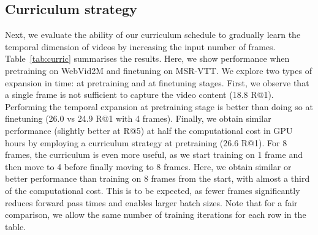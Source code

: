 \documentclass[10pt,twocolumn,letterpaper]{article}
\begin{document}
\subsection{Curriculum strategy}
\label{subsec:curriculumexp}
Next, we evaluate the ability of our curriculum schedule
to gradually learn the temporal dimension of videos
by increasing the input number of frames.
Table~\ref{tab:curric} summarises the results.
Here, we show performance when pretraining on WebVid2M and
finetuning on MSR-VTT.
We explore two types of expansion in time:
at pretraining and at finetuning stages.
First, we observe that a single frame is not sufficient
to capture the video content (18.8 R@1).
Performing the temporal expansion at pretraining stage
is better than doing so at finetuning (26.0 vs 24.9 R@1 with 4 frames).
Finally, we obtain similar performance (slightly better at R@5) at half the computational
cost in GPU hours by employing a curriculum strategy at pretraining (26.6 R@1).
For 8 frames, the curriculum is even more useful, as we start training on 1 frame and then move to 4 before finally moving to 8 frames. Here, we obtain similar or better performance than training on 8 frames from the start, with almost a third of the computational cost. This is to be expected, as fewer frames significantly reduces forward pass times and enables larger batch sizes.
Note that for a fair comparison, we allow the same number of training
iterations for each row in the table.
\begin{table}
\centering
\caption{\textbf{Effect of \#frames and curriculum learning:} The effect of a different number of input frames at pretraining and finetuning.  indicates a within-dataset curriculum learning strategy. Results are presented on the 1K-A MSR-VTT test set for text-video retrieval. Pretraining here is done on WebVid2M only, with a total budget of one epoch through the entire dataset. \textbf{PTT:} total pretraining time in hours.}
\label{tab:curric}
\end{table}
\end{document}
